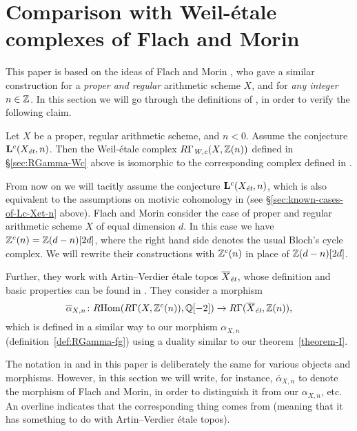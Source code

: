 \documentclass{article}
\numberwithin{equation}{section}
\begin{document}

\section{Comparison with Weil-étale complexes of Flach and Morin}
\label{sec:comparison-with-FM}

This paper is based on the ideas of Flach and Morin \cite{Flach-Morin-2018}, who
gave a similar construction for a \emph{proper and regular} arithmetic scheme
$X$, and for \emph{any integer} $n \in \ZZ$. In this section we will go through
the definitions of \cite{Flach-Morin-2018}, in order to verify the following
claim.

\begin{proposition}
  \label{prop:comparison-with-FM}
  Let $X$ be a proper, regular arithmetic scheme, and $n < 0$. Assume the
  conjecture $\mathbf{L}^c (X_\et, n)$. Then the Weil-étale complex
  $R\Gamma_\Wc (X, \ZZ(n))$ defined in \S\ref{sec:RGamma-Wc} above is isomorphic
  to the corresponding complex defined in \cite{Flach-Morin-2018}.
\end{proposition}

From now on we will tacitly assume the conjecture $\mathbf{L}^c (X_\et, n)$,
which is also equivalent to the assumptions on motivic cohomology in
\cite{Flach-Morin-2018} (see \S\ref{sec:known-cases-of-Lc-Xet-n} above). Flach
and Morin consider the case of proper and regular arithmetic scheme $X$ of equal
dimension $d$. In this case we have $\ZZ^c (n) = \ZZ (d-n) [2d]$, where the
right hand side denotes the usual Bloch's cycle complex. We will rewrite their
constructions with $\ZZ^c (n)$ in place of $\ZZ (d-n) [2d]$.

Further, they work with Artin--Verdier étale topos $\overline{X}_\et$, whose
definition and basic properties can be found in \cite[\S 6]{Flach-Morin-2018}.
They consider a morphism
\[ \overline{\alpha}_{X,n}\colon \RHom (R\Gamma (X, \ZZ^c (n)), \QQ [-2]) \to
  R\Gamma (\overline{X}_\et, \ZZ (n)), \]
which is defined in a similar way to our morphism $\alpha_{X,n}$
(definition~\ref{def:RGamma-fg}) using a duality similar to our
theorem~\ref{theorem-I}.

The notation in \cite{Flach-Morin-2018} and in this paper is deliberately the
same for various objects and morphisms. However, in this section we will write,
for instance, $\overline{\alpha}_{X,n}$ to denote the morphism of Flach and
Morin, in order to distinguish it from our $\alpha_{X,n}$, etc. An overline
indicates that the corresponding thing comes from \cite{Flach-Morin-2018}
(meaning that it has something to do with Artin--Verdier étale topos).
\end{document}
